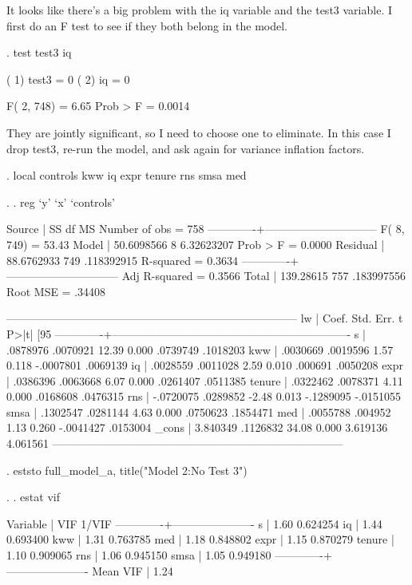 \documentclass[12pt]{article}
\begin{document}
It looks like there's a big problem with the iq variable and the test3
variable. I first do an F test to see if they both belong in the
model. 

\begin{stlog}
  
. test test3 iq

 ( 1)  test3 = 0
 ( 2)  iq = 0

       F(  2,   748) =    6.65
            Prob > F =    0.0014

\end{stlog}

They are jointly significant, so I need to choose one to
eliminate. In this case I drop test3, re-run the model, and ask again
for variance inflation factors. 


\begin{stlog}
  
. local controls kww iq expr tenure rns smsa med 

. 
. reg `y' `x' `controls'

      Source |       SS       df       MS              Number of obs =     758
-------------+------------------------------           F(  8,   749) =   53.43
       Model |  50.6098566     8  6.32623207           Prob > F      =  0.0000
    Residual |  88.6762933   749  .118392915           R-squared     =  0.3634
-------------+------------------------------           Adj R-squared =  0.3566
       Total |   139.28615   757  .183997556           Root MSE      =  .34408

------------------------------------------------------------------------------
          lw |      Coef.   Std. Err.      t    P>|t|     [95%
-------------+----------------------------------------------------------------
           s |   .0878976   .0070921    12.39   0.000     .0739749    .1018203
         kww |   .0030669   .0019596     1.57   0.118    -.0007801    .0069139
          iq |   .0028559   .0011028     2.59   0.010      .000691    .0050208
        expr |   .0386396   .0063668     6.07   0.000     .0261407    .0511385
      tenure |   .0322462   .0078371     4.11   0.000     .0168608    .0476315
         rns |  -.0720075   .0289852    -2.48   0.013    -.1289095   -.0151055
        smsa |   .1302547   .0281144     4.63   0.000     .0750623    .1854471
         med |   .0055788    .004952     1.13   0.260    -.0041427    .0153004
       _cons |   3.840349   .1126832    34.08   0.000     3.619136    4.061561
------------------------------------------------------------------------------

. eststo full_model_a, title("Model 2:No Test 3")

. 
. estat vif

    Variable |       VIF       1/VIF  
-------------+----------------------
           s |      1.60    0.624254
          iq |      1.44    0.693400
         kww |      1.31    0.763785
         med |      1.18    0.848802
        expr |      1.15    0.870279
      tenure |      1.10    0.909065
         rns |      1.06    0.945150
        smsa |      1.05    0.949180
-------------+----------------------
    Mean VIF |      1.24

\end{stlog}
\end{document}
